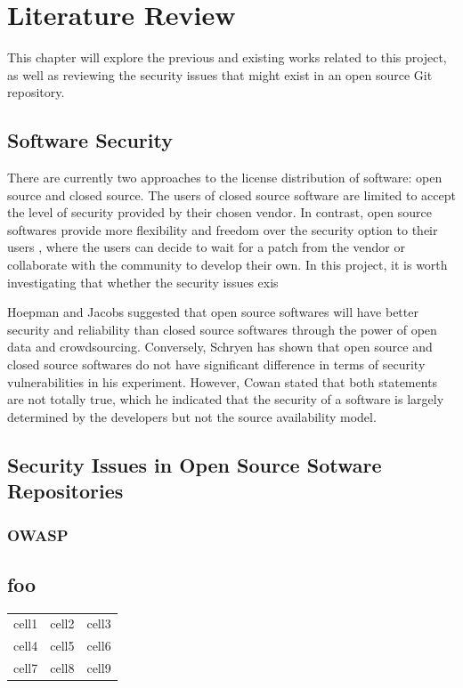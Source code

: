 \documentclass[12pt, a4paper]{report}
\begin{document}
\chapter{Literature Review}
This chapter will explore the previous and existing works related to this project, as well as
reviewing the security issues that might exist in an open source Git repository.

\section{Software Security}
There are currently two approaches to the license distribution of software: open source and closed
source. The users of closed source software are limited to accept the level of security
provided by their chosen vendor. In contrast, open source softwares provide more flexibility and
freedom over the security option to their users \cite{payne_2002}, where the users can decide to
wait for a patch from the vendor or collaborate with the community to develop their own. In this
project, it is worth investigating that whether the security issues exis

Hoepman and Jacobs \cite{hoepman_2007} suggested that open source softwares will have better
security and reliability than closed source softwares through the power of open data and
crowdsourcing. Conversely, Schryen \cite{schryen_2011} has shown that open source and closed source
softwares do not have significant difference in terms of security vulnerabilities in his experiment.
However, Cowan \cite{cowan_2003} stated that both statements are not totally true, which he
indicated that the security of a software is largely determined by the developers but not the source
availability model.

\section{Security Issues in Open Source Sotware Repositories}
\subsection{OWASP}

\section{foo}
\begin{table}[H]
	\begin{center}
		\begin{tabular}{ c c c }
			cell1 & cell2 & cell3 \\
      cell4 & cell5 & cell6 \\
			cell7 & cell8 & cell9
		\end{tabular}
		 \label{table:celltable}
	\end{center}
\end{table}
\end{document}

